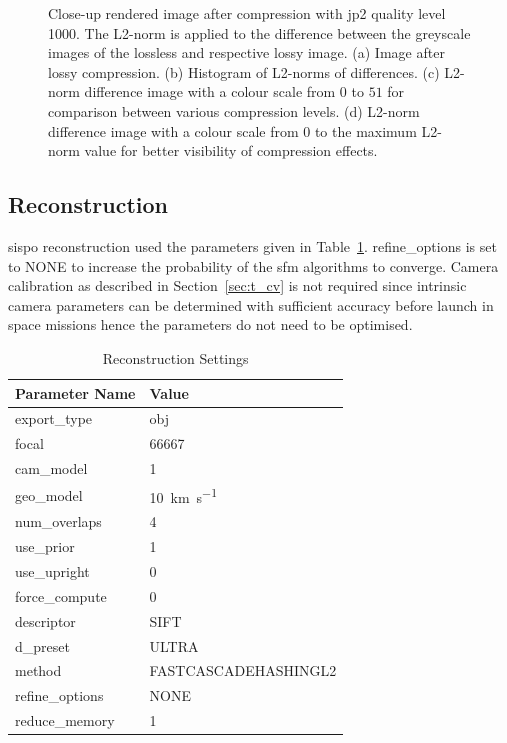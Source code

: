 \begin{figure}[htb]
\begin{subfigure}[b]{0.48\textwidth}
        \caption{}
        \label{fig:img_quality_comp_jp2_1000_center_diff_rel}
    \end{subfigure}
    \caption{Close-up rendered image after compression with \gls{jp2} quality level 1000. The L2-norm is applied to the difference between the greyscale images of the lossless and respective lossy image. (a) Image after lossy compression. (b) Histogram of L2-norms of differences. (c) L2-norm difference image with a colour scale from $0$ to $51$ for comparison between various compression levels. (d) L2-norm difference image with a colour scale from $0$ to the maximum L2-norm value for better visibility of compression effects.}
    \label{fig:img_quality_comp_jp2_1000_center}
\end{figure}

\clearpage

\subsection{Reconstruction}
\gls{sispo} reconstruction used the parameters given in Table~\ref{tab:comp_settings}. refine\_options is set to NONE to increase the probability of the \gls{sfm} algorithms to converge. Camera calibration as described in Section~\ref{sec:t_cv} is not required since intrinsic camera parameters can be determined with sufficient accuracy before launch in space missions hence the parameters do not need to be optimised.

\begin{table}[htb]
    \centering
    \caption{Reconstruction Settings}
    \label{tab:comp_settings}
    \begin{tabular}{l|l}
        \textbf{Parameter Name} & \textbf{Value} \\ \hline
        export\_type       & obj   \\
        focal & 66667 \\
        cam\_model & \SI{1}{}     \\
        geo\_model & \SI{10}{\kilo\meter\per\second} \\
        num\_overlaps  & \SI{4}{} \\
        use\_prior & \SI{1}{} \\
        use\_upright & \SI{0}{} \\
        force\_compute & \SI{0}{} \\
        descriptor & SIFT \\
        d\_preset & ULTRA \\
        method & FASTCASCADEHASHINGL2 \\
        refine\_options & NONE \\
        reduce\_memory & 1
    \end{tabular}
\end{table}

